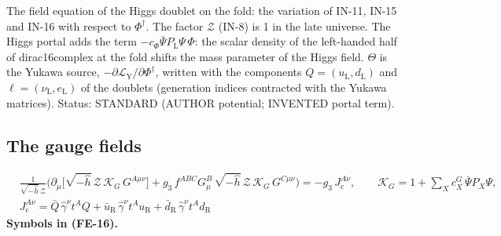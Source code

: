 \documentclass[
  10pt,
]{article}
\begin{document}
The field equation of the Higgs doublet on the fold: the variation of
IN-11, IN-15 and IN-16 with respect to \(\Phi^\dagger\). The factor
\(\mathcal{Z}\) (IN-8) is 1 in the late universe. The Higgs portal adds
the term \(-c_\Phi\bar\Psi P_{\mathrm{L}}\Psi\,\Phi\): the scalar
density of the left-handed half of dirac16complex at the fold shifts the
mass parameter of the Higgs field. \(\Theta\) is the Yukawa source,
\(-\partial\mathcal{L}_{\mathrm{Y}}/\partial\Phi^\dagger\), written with
the components \(Q = (u_{\mathrm{L}}, d_{\mathrm{L}})\) and
\(\ell = (\nu_{\mathrm{L}}, e_{\mathrm{L}})\) of the doublets
(generation indices contracted with the Yukawa matrices). Status:
STANDARD (AUTHOR potential; INVENTED portal term).

\hypertarget{the-gauge-fields-1}{%
\subsection{The gauge fields}\label{the-gauge-fields-1}}

\[
\begin{aligned}
&\frac{1}{\sqrt{-\hat h}\,\mathcal{Z}}\Big(\partial_\mu\big[\sqrt{-\hat h}\,\mathcal{Z}\,\mathcal{K}_{G}\,G^{A\mu\nu}\big]
 + g_3\,f^{ABC}G^B_\mu\,\sqrt{-\hat h}\,\mathcal{Z}\,\mathcal{K}_{G}\,G^{C\mu\nu}\Big) = -g_3\,J_{\mathrm{c}}^{A\nu},\qquad
 \mathcal{K}_{G} = 1 + \sum_X c^{G}_X\,\bar\Psi P_X\Psi,\\
&J_{\mathrm{c}}^{A\nu} = \bar Q\,\hat\gamma^\nu t^AQ + \bar u_{\mathrm{R}}\,\hat\gamma^\nu t^Au_{\mathrm{R}}
 + \bar d_{\mathrm{R}}\,\hat\gamma^\nu t^Ad_{\mathrm{R}}
\end{aligned} \tag{FE-16}
\] \textbf{Symbols in (FE-16).}
\end{document}

